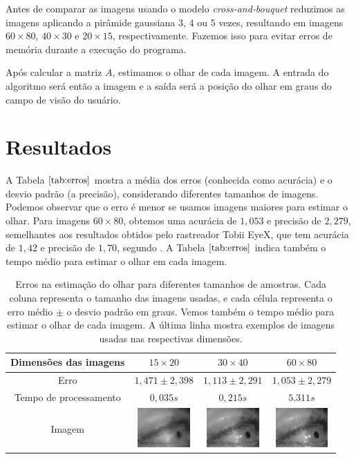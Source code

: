 Antes de comparar as imagens usando o modelo \textit{cross-and-bouquet} reduzimos as imagens aplicando a pirâmide gaussiana $3$, $4$ ou $5$ vezes, resultando em imagens $60 \times 80$, $40 \times 30$ e $20 \times 15$, respectivamente. Fazemos isso para evitar erros de memória durante a execução do programa.

Após calcular a matriz $A$, estimamos o olhar de cada imagem. A entrada do algoritmo será então a imagem e a saída será a posição do olhar em graus do campo de visão do usuário.

\section{Resultados}
A Tabela $\ref{tab:erros}$ mostra a média dos erros (conhecida como acurácia) e o desvio padrão (a precisão), considerando  diferentes tamanhos de imagens. Podemos observar que o erro é menor se usamos imagens maiores para estimar o olhar. Para imagens $60 \times 80$, obtemos uma acurácia de $1,053 $ e precisão de $2,279$, semelhantes aos resultados obtidos pelo rastreador Tobii EyeX, que tem acurácia de $1,42$ e precisão de $1,70$, segundo \cite{liboku}. A Tabela $\ref{tab:erros}$ indica também o tempo médio para estimar o olhar em cada imagem.

\begin{table}
\centering
\begin{tabular}{| c | c | c | c |}
\hline
Dimensões das imagens & $15 \times 20$ & $30 \times 40$ & $60 \times 80$ \\ \hline
Erro				  & $1,471 \pm 2,398$ & $1,113 \pm 2,291$ & $1,053 \pm 2,279$ \\ \hline
Tempo de processamento & $0,035s$ & $0,215s$ & $5.311s$ \\ \hline
Imagem & \vspace{2pt} \includegraphics[width=2cm]{imagens/olho_20_15.jpg} & \includegraphics[width=2cm]{imagens/olho_40_30.jpg} & \includegraphics[width=2cm]{imagens/olho_80_60.jpg} \\ \hline
\end{tabular}
\caption{Erros na estimação do olhar para diferentes tamanhos de amostras. Cada coluna representa o tamanho das imagens usadas, e cada célula representa o erro médio $\pm$ o desvio padrão em graus. Vemos também o tempo médio para estimar o olhar de cada imagem. A última linha mostra exemplos de imagens usadas nas respectivas dimensões.}
\label{tab:erros}
\end{table}

